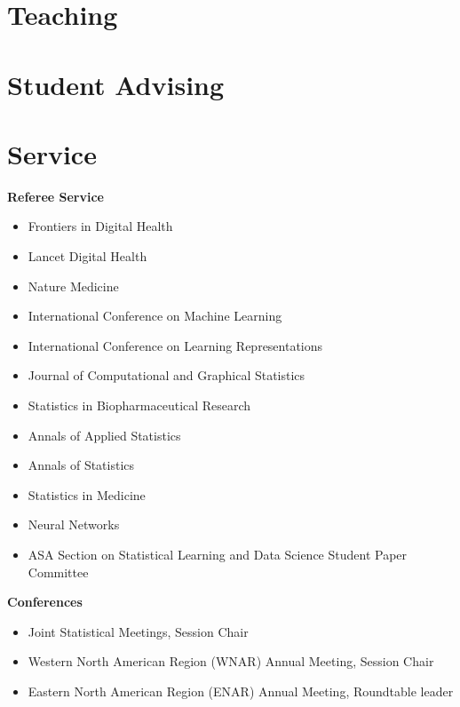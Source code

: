 \documentclass[11pt,a4paper,sans]{moderncv}        %
\begin{document}
\section{Teaching}

\section{Student Advising}

\section{Service}
\textbf{Referee Service}
\begin{itemize}
	\item Frontiers in Digital Health %
	\item Lancet Digital Health %
	\item Nature Medicine %
        \item International Conference on Machine Learning %
        \item International Conference on Learning Representations %
	\item Journal of Computational and Graphical Statistics %
	\item Statistics in Biopharmaceutical Research %
	\item Annals of Applied Statistics %
	\item Annals of Statistics %
	\item Statistics in Medicine %
	\item Neural Networks %
	\item ASA Section on Statistical Learning and Data Science Student Paper Committee %
\end{itemize}

\textbf{Conferences}
\begin{itemize}
\item Joint Statistical Meetings, Session Chair
\item Western North American Region (WNAR) Annual Meeting, Session Chair
\item Eastern North American Region (ENAR) Annual Meeting, Roundtable leader
\end{itemize}
\end{document}
